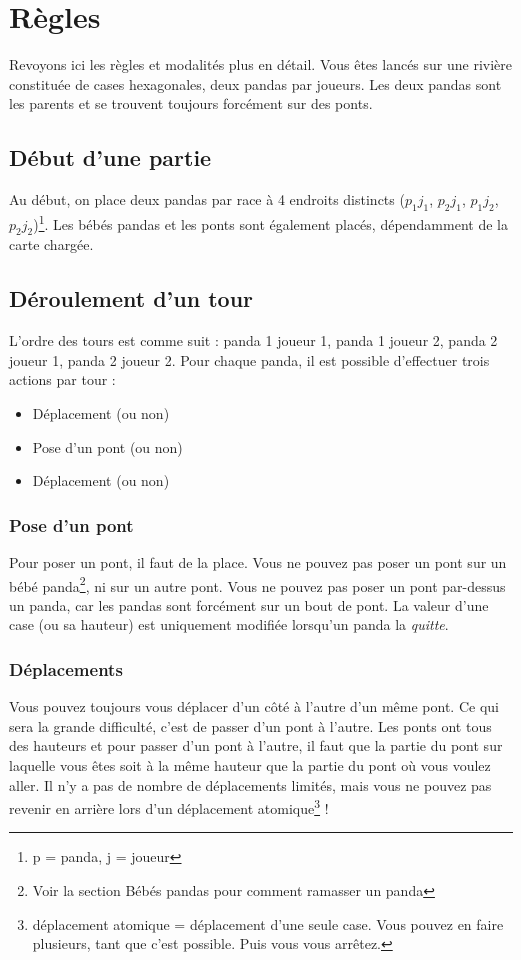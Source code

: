 
\section{Règles}
Revoyons ici les règles et modalités plus en détail. Vous êtes lancés sur une rivière constituée de cases hexagonales, deux pandas par joueurs. Les deux pandas sont les parents et se trouvent toujours forcément sur des ponts.

\subsection{Début d'une partie}
Au début, on place deux pandas par race à 4 endroits distincts ($p_1j_1$, $p_2j_1$, $p_1j_2$, $p_2j_2$)\footnote{p = panda, j = joueur}. Les bébés pandas et les ponts sont également placés, dépendamment de la carte chargée.

\subsection{Déroulement d'un tour}
L'ordre des tours est comme suit : panda 1 joueur 1, panda 1 joueur 2, panda 2 joueur 1, panda 2 joueur 2. Pour chaque panda, il est possible d'effectuer trois actions par tour :

\begin{itemize}
    \item Déplacement (ou non)
    \item Pose d'un pont (ou non)
    \item Déplacement (ou non)
\end{itemize}

\subsubsection{Pose d'un pont}
Pour poser un pont, il faut de la place. Vous ne pouvez pas poser un pont sur un bébé panda\footnote{Voir la section Bébés pandas pour comment ramasser un panda}, ni sur un autre pont. Vous ne pouvez pas poser un pont par-dessus un panda, car les pandas sont forcément sur un bout de pont. La valeur d'une case (ou sa hauteur) est uniquement modifiée lorsqu'un panda la \textit{quitte}.


\subsubsection{Déplacements}
Vous pouvez toujours vous déplacer d'un côté à l'autre d'un même pont. Ce qui sera la grande difficulté, c'est de passer d'un pont à l'autre. Les ponts ont tous des hauteurs et pour passer d'un pont à l'autre, il faut que la partie du pont sur laquelle vous êtes soit à la même hauteur que la partie du pont où vous voulez aller. Il n'y a pas de nombre de déplacements limités, mais vous ne pouvez pas revenir en arrière lors d'un déplacement atomique\footnote{déplacement atomique = déplacement d'une seule case. Vous pouvez en faire plusieurs, tant que c'est possible. Puis vous vous arrêtez.} !

